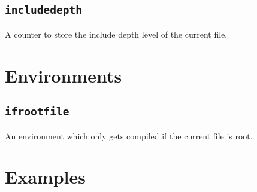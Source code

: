 \documentclass{article}
\begin{document}
\subsection{\texttt{includedepth}}\label{sec:counters:includedepth}
    A counter to store the include depth level of the current file.

\section{Environments}
\subsection{\texttt{ifrootfile}}\label{sec:environments:ifrootfile}
    An environment which only gets compiled if the current file is root.

\section{Examples}
\end{document}
